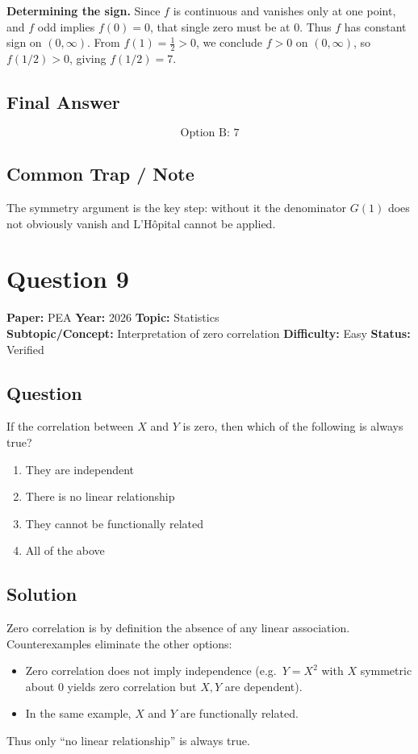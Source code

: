 \documentclass[11pt]{article}
\begin{document}
\textbf{Determining the sign.}
Since $f$ is continuous and vanishes only at one point, and $f$ odd implies
$f(0)=0$, that single zero must be at $0$. Thus $f$ has constant sign on
$(0,\infty)$. From $f(1) = \tfrac{1}{2} > 0$, we conclude $f > 0$ on $(0,\infty)$,
so $f(1/2) > 0$, giving $f(1/2) = 7$.

\subsection*{Final Answer}
\[
\boxed{\text{Option B: } 7}
\]

\subsection*{Common Trap / Note}
The symmetry argument is the key step: without it the denominator $G(1)$ does not
obviously vanish and L'H\^opital cannot be applied.

\section*{Question 9}
\textbf{Paper:} PEA \quad \textbf{Year:} 2026 \quad \textbf{Topic:} Statistics \\
\textbf{Subtopic/Concept:} Interpretation of zero correlation \quad
\textbf{Difficulty:} Easy \quad \textbf{Status:} Verified

\subsection*{Question}
If the correlation between $X$ and $Y$ is zero, then which of the following is always true?
\begin{enumerate}[label=(\Alph*)]
\item They are independent
\item There is no linear relationship
\item They cannot be functionally related
\item All of the above
\end{enumerate}

\subsection*{Solution}
Zero correlation is by definition the absence of any linear association.
Counterexamples eliminate the other options:
\begin{itemize}
\item Zero correlation does not imply independence (e.g.\ $Y = X^2$ with $X$ symmetric about $0$ yields zero correlation but $X, Y$ are dependent).
\item In the same example, $X$ and $Y$ are functionally related.
\end{itemize}
Thus only ``no linear relationship'' is always true.
\end{document}
